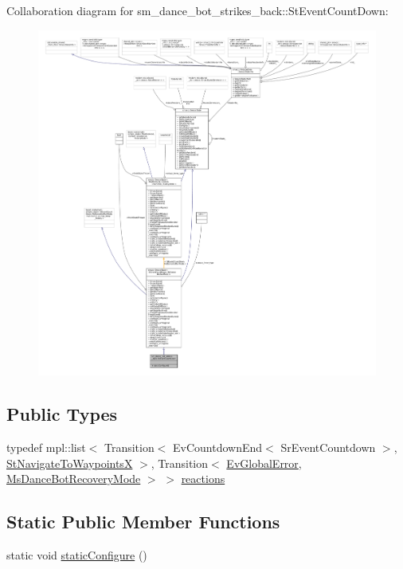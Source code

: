 Collaboration diagram for sm\+\_\+dance\+\_\+bot\+\_\+strikes\+\_\+back\+:\+:St\+Event\+Count\+Down\+:
\nopagebreak
\begin{figure}[H]
\begin{center}
\leavevmode
\includegraphics[width=350pt]{structsm__dance__bot__strikes__back_1_1StEventCountDown__coll__graph}
\end{center}
\end{figure}
\subsection*{Public Types}
\begin{DoxyCompactItemize}
\item 
typedef mpl\+::list$<$ Transition$<$ Ev\+Countdown\+End$<$ Sr\+Event\+Countdown $>$, \hyperlink{structsm__dance__bot__strikes__back_1_1StNavigateToWaypointsX}{St\+Navigate\+To\+WaypointsX} $>$, Transition$<$ \hyperlink{structsm__dance__bot__strikes__back_1_1EvGlobalError}{Ev\+Global\+Error}, \hyperlink{classsm__dance__bot__strikes__back_1_1MsDanceBotRecoveryMode}{Ms\+Dance\+Bot\+Recovery\+Mode} $>$ $>$ \hyperlink{structsm__dance__bot__strikes__back_1_1StEventCountDown_a854ccb5b93cb3e2a87fe02b0b4990016}{reactions}
\end{DoxyCompactItemize}
\subsection*{Static Public Member Functions}
\begin{DoxyCompactItemize}
\item 
static void \hyperlink{structsm__dance__bot__strikes__back_1_1StEventCountDown_a2b0d518bcc72065392d547d69c0dff7d}{static\+Configure} ()
\end{DoxyCompactItemize}
